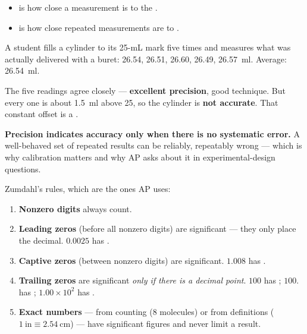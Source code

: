 \documentclass{apchem-notes}
\begin{document}

\begin{itemize}[leftmargin=*,itemsep=0.3em]
  \item {} is how close a measurement is to the
        .
  \item {} is how close repeated measurements are to
        .
\end{itemize}

\begin{apcnote}
A student fills a cylinder to its 25-mL mark five times and measures what
was actually delivered with a buret: 26.54, 26.51, 26.60, 26.49,
\SI{26.57}{\milli\litre}. Average: \SI{26.54}{\milli\litre}.

The five readings agree closely --- \textbf{excellent precision}, good
technique. But every one is about \SI{1.5}{\milli\litre} above 25, so the
cylinder is \textbf{not accurate}. That constant offset is a
.

\textbf{Precision indicates accuracy only when there is no systematic
error.} A well-behaved set of repeated results can be reliably, repeatably
wrong --- which is why calibration matters and why AP asks about it in
experimental-design questions.
\end{apcnote}


Zumdahl's rules, which are the ones AP uses:

\begin{enumerate}[leftmargin=*,itemsep=0.3em]
  \item \textbf{Nonzero digits} always count.
  \item \textbf{Leading zeros} (before all nonzero digits) are
         significant --- they only place the
        decimal. $0.0025$ has .
  \item \textbf{Captive zeros} (between nonzero digits) are
         significant. $1.008$ has
        .
  \item \textbf{Trailing zeros} are significant \emph{only if there is a
        decimal point}. $100$ has ;
        $100.$ has ; $1.00\times10^{2}$ has
        .
  \item \textbf{Exact numbers} --- from counting (8 molecules) or from
        definitions ($1~\text{in} \equiv 2.54~\text{cm}$) --- have
         significant figures and never limit a
        result.
\end{enumerate}
\end{document}
